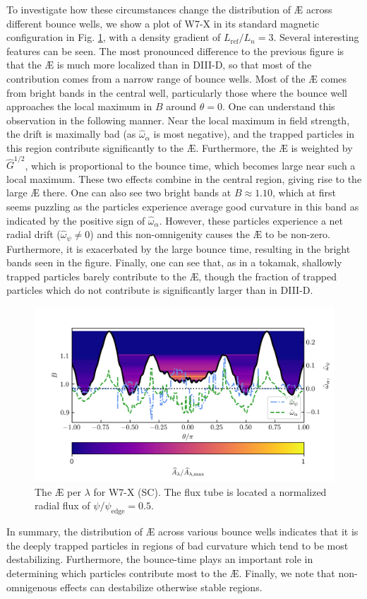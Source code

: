 To investigate how these circumstances change the distribution of \AE{} across different bounce wells, we show a plot of W7-X in its standard magnetic configuration in Fig. \ref{fig:AE_per_bw_W7X}, with a density gradient of $L_\mathrm{ref}/L_n = 3$. Several interesting features can be seen. The most pronounced difference to the previous figure is that the \AE{} is much more localized than in DIII-D, so that most of the contribution comes from a narrow range of bounce wells. Most of the \AE{} comes from bright bands in the central well, particularly those where the bounce well approaches the local maximum in $B$ around $\theta = 0$. One can understand this observation in the following manner. Near the local maximum in field strength, the drift is maximally bad (as $\hat{\omega}_\alpha$ is most negative), and the trapped particles in this region contribute significantly to the \AE{}. Furthermore, the \AE{} is weighted by $\hat{G}^{1/2}$, which is proportional to the bounce time, which becomes large near such a local maximum. These two effects combine in the central region, giving rise to the large \AE{} there. One can also see two bright bands at $B \approx 1.10$, which at first seems puzzling as the particles experience average good curvature in this band as indicated by the positive sign of $\hat{\omega}_\alpha$. However, these particles experience a net radial drift ($\hat{\omega}_\psi \neq 0$) and this non-omnigenity causes the \AE{} to be non-zero. Furthermore, it is exacerbated by the large bounce time, resulting in the bright bands seen in the figure. Finally, one can see that, as in a tokamak, shallowly trapped particles barely contribute to the \AE{}, though the fraction of trapped particles which do not contribute is significantly larger than in DIII-D. \par
\begin{figure}
    \centering
    \includegraphics[width=\textwidth]{3_chapters/1_papers/AE-TE/figures/AE_per_lam_W7XSC.png}
    \caption{The \AE{} per $\lambda$ for W7-X (SC). The flux tube is located a normalized radial flux of $\psi/\psi_\mathrm{edge}=0.5$.}
    \label{fig:AE_per_bw_W7X}
\end{figure}
In summary, the distribution of \AE{} across various bounce wells indicates that it is the deeply trapped particles in regions of bad curvature which tend to be most destabilizing. Furthermore, the bounce-time plays an important role in determining which particles contribute most to the \AE{}. Finally, we note that non-omnigenous effects can destabilize otherwise stable regions.
